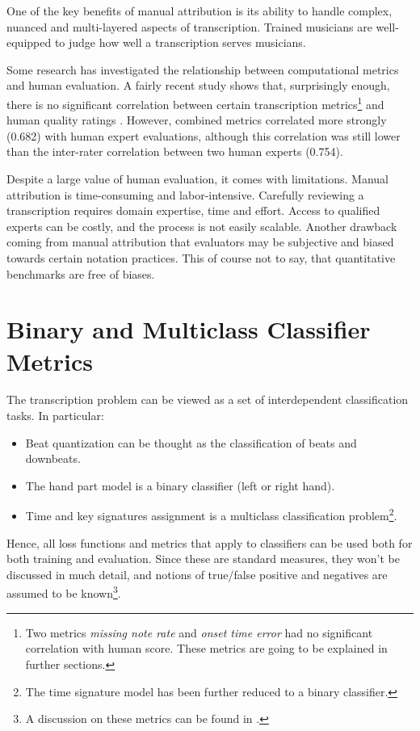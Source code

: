 One of the key benefits of manual attribution is its ability to handle complex, nuanced and multi-layered aspects of transcription. Trained musicians are well-equipped to judge how well a transcription serves musicians.

Some research has investigated the relationship between computational metrics and human evaluation. A fairly recent study shows that, surprisingly enough, there is no significant correlation between certain transcription metrics\footnote{Two metrics \emph{missing note rate} and \emph{onset time error} had no significant correlation with human score. These metrics are going to be explained in further sections.} and human quality ratings \cite{Holzapfel2021}. However, combined metrics correlated more strongly (0.682) with human expert evaluations, although this correlation was still lower than the inter-rater correlation between two human experts (0.754).

Despite a large value of human evaluation, it comes with limitations. Manual attribution is time-consuming and labor-intensive. Carefully reviewing a transcription requires domain expertise, time and effort. Access to qualified experts can be costly, and the process is not easily scalable. Another drawback coming from manual attribution that evaluators may be subjective and biased towards certain notation practices. This of course not to say, that quantitative benchmarks are free of biases.

\section{Binary and Multiclass Classifier Metrics} \label{binary_and_multiclass_classifier_metrics}

The transcription problem can be viewed as a set of interdependent classification tasks. In particular: \begin{itemize}
	\item Beat quantization can be thought as the classification of beats and downbeats.
	\item The hand part model is a binary classifier (left or right hand).
	\item Time and key signatures assignment is a multiclass classification problem\footnote{The time signature model has been further reduced to a binary classifier.}. \end{itemize} Hence, all loss functions and metrics that apply to classifiers can be used both for both training and evaluation. Since these are standard measures, they won't be discussed in much detail, and notions of true/false positive and negatives are assumed to be known\footnote{A discussion on these metrics can be found in \cite[p. 142--144]{Manning2008}.}.

